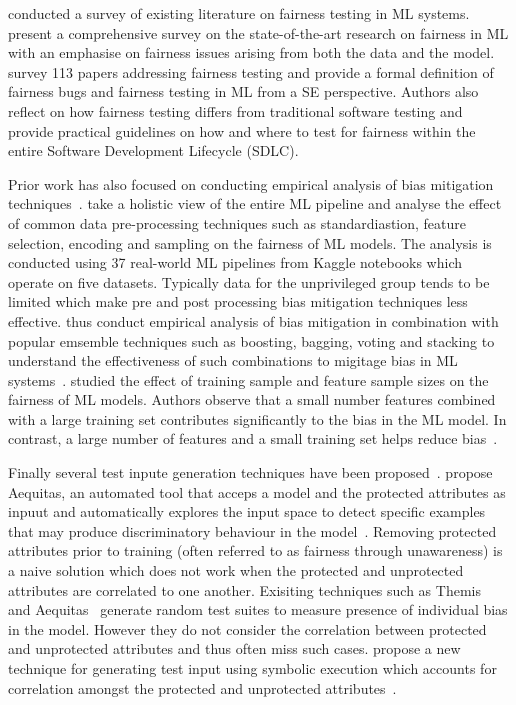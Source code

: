 \documentclass{article}
\begin{document}
\citeauthor{chen2022fairness,mehrabi2021survey} conducted a survey of
existing literature on fairness testing in ML systems.
\citeauthor{mehrabi2021survey} present a comprehensive survey on the
state-of-the-art research on fairness in ML with an emphasise on
fairness issues arising from both the data and the model.
\citeauthor{chen2022fairness} survey 113 papers addressing fairness
testing and provide a formal definition of fairness bugs and fairness
testing in ML from a SE perspective. Authors also reflect on how
fairness testing differs from traditional software testing and provide
practical guidelines on how and where to test for fairness within the
entire Software Development Lifecycle (SDLC).

Prior work has also focused on conducting empirical analysis of bias
mitigation
techniques \cite{biswas2021fair,feffer2022empirical,zhang2021ignorance}.
\citeauthor{biswas2021fair} take a holistic view of the entire ML
pipeline and analyse the effect of common data pre-processing
techniques such as standardiastion, feature selection, encoding and
sampling on the fairness of ML models. The analysis is conducted using
37 real-world ML pipelines from Kaggle notebooks which operate on five
datasets. Typically data for the unprivileged group tends to be
limited which make pre and post processing bias mitigation techniques
less effective. \citeauthor{feffer2022empirical} thus conduct
empirical analysis of bias mitigation in combination with popular
emsemble techniques such as boosting, bagging, voting and stacking to
understand the effectiveness of such combinations to migitage bias in
ML systems \cite{feffer2022empirical}. \citeauthor{zhang2021ignorance}
studied the effect of training sample and feature sample sizes on the
fairness of ML models. Authors observe that a small number features
combined with a large training set contributes significantly to the
bias in the ML model. In contrast, a large number of features and a
small training set helps reduce bias \cite{zhang2021ignorance}.

Finally several test inpute generation techniques have been
proposed \cite{aggarwal2019black,udeshi2018automated}.
\citeauthor{udeshi2018automated} propose Aequitas, an automated tool
that acceps a model and the protected attributes as inpuut and
automatically explores the input space to detect specific examples
that may produce discriminatory behaviour in the
model \cite{udeshi2018automated}. Removing protected attributes prior
to training (often referred to as fairness through unawareness) is a
naive solution which does not work when the protected and unprotected
attributes are correlated to one another. Exisiting techniques such as
Themis \cite{galhotra2017fairness} and
Aequitas \cite{udeshi2018automated} generate random test suites to
measure presence of individual bias in the model. However they do not
consider the correlation between protected and unprotected attributes
and thus often miss such cases. \citeauthor{aggarwal2019black} propose
a new technique for generating test input using symbolic execution
which accounts for correlation amongst the protected and unprotected
attributes \cite{aggarwal2019black}.
\end{document}
